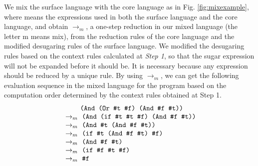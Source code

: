 We mix the surface language with the core language as in Fig. \ref{fig:mixexample}, where  means the expressions used in both the surface language and the core language, and obtain $\to_m$, a one-step reduction in our mixed language (the letter m means mix), from the reduction rules of the core language and the modified desugaring rules of the surface language. We modified the desugaring rules based on the context rules calculated at {\em Step 1}, so that the sugar expression will not be expanded before it should be. It is necessary because any expression should be reduced by a unique rule. By using $\to_m$, we can get the following evaluation sequence in the mixed language for
the program  based on the computation order determined by the context rules obtained at Step 1.
\[
    \begin{array}{ll}
        \qquad\;\,\texttt{(And (Or \#t~\#f) (And \#f~\#t))}\\
        ~\rightarrow_m~\texttt{(And (if \#t~\#t~\#f) (And \#f~\#t))}\\
        ~\rightarrow_m~\texttt{(And \#t~(And \#f~\#t))}\\
        ~\rightarrow_m~\texttt{(if \#t~(And \#f~\#t) \#f)}\\
        ~\rightarrow_m~\texttt{(And \#f~\#t)}\\
        ~\rightarrow_m~\texttt{(if \#f~\#t~\#f)}\\
        ~\rightarrow_m~\texttt{\#f}\\
    \end{array}
\]





